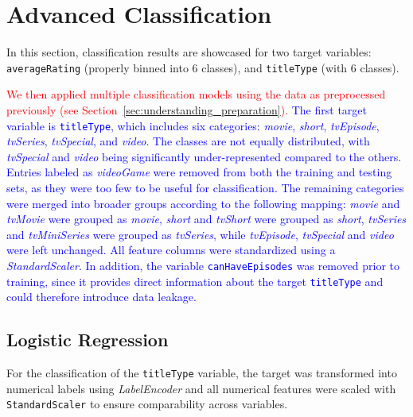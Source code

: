 \section{Advanced Classification}
\label{sec:advanced_classification}

In this section, classification results are showcased for two
target variables: \texttt{averageRating} (properly binned into
6 classes), and \texttt{titleType} (with 6 classes).

\textcolor{red}{We then applied multiple classification models using the data as preprocessed previously (see Section~\ref{sec:understanding_preparation}).}   
\textcolor{blue}{The first target variable is \texttt{titleType}, which includes six categories: 
\textit{movie}, \textit{short}, \textit{tvEpisode}, \textit{tvSeries}, 
\textit{tvSpecial}, and \textit{video}. 
The classes are not equally distributed, with \textit{tvSpecial} and \textit{video} 
being significantly under-represented compared to the others. Entries labeled as \textit{videoGame} were removed from both the training and testing sets, 
as they were too few to be useful for classification. 
The remaining categories were merged into broader groups according to the following mapping: 
\textit{movie} and \textit{tvMovie} were grouped as \textit{movie}, 
\textit{short} and \textit{tvShort} were grouped as \textit{short}, 
\textit{tvSeries} and \textit{tvMiniSeries} were grouped as \textit{tvSeries}, 
while \textit{tvEpisode}, \textit{tvSpecial} and \textit{video} were left unchanged. 
All feature columns were standardized using a \textit{StandardScaler}. 
In addition, the variable \texttt{canHaveEpisodes} was removed prior to training, 
since it provides direct information about the target \texttt{titleType} 
and could therefore introduce data leakage.}

\subsection{Logistic Regression}
\label{subsec:logistic}

For the classification of the \texttt{titleType} variable, the target was transformed 
into numerical labels using \textit{LabelEncoder} and all numerical features were scaled 
with \texttt{StandardScaler} to ensure comparability across variables.

